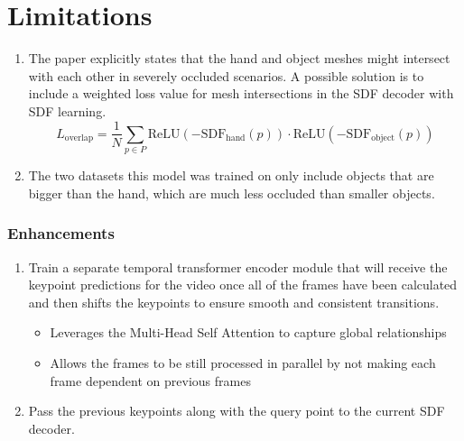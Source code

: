 \documentclass{article}
\begin{document}
\section*{Limitations}

\begin{enumerate}
    \item The paper explicitly states that the hand and object meshes might intersect with each
    other in severely occluded scenarios. A possible solution is to include a weighted loss value for mesh intersections in the SDF decoder with SDF learning.
    \[L_\text{overlap}=\frac{1}{N}\sum_{p\in P} \text{ReLU}(-\text{SDF}_\text{hand}(p))\cdot \text{ReLU}(-\text{SDF}_\text{object}(p))\]
    \item The two datasets this model was trained on only include objects that are bigger than the
    hand, which are much less occluded than smaller objects.
\end{enumerate}

\subsubsection*{Enhancements}
\begin{enumerate}
    \item Train a separate temporal transformer encoder module that will receive the keypoint predictions for the video once all of the frames have been calculated and then shifts the keypoints to ensure smooth and consistent transitions.
    \begin{itemize}
        \item Leverages the Multi-Head Self Attention to capture global relationships
        \item Allows the frames to be still processed in parallel by not making each frame dependent on previous frames
    \end{itemize}
    \item Pass the previous keypoints along with the query point to the current SDF decoder.
\end{enumerate}
\end{document}
